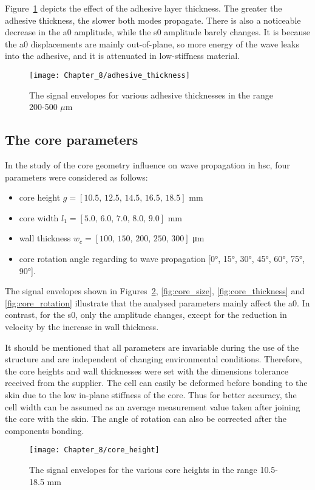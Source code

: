 \documentclass[11pt,a4paper,final]{report}
\theoremstyle{plain}
\begin{document}
Figure~\ref{fig:adhesive_thickness} depicts the effect of the adhesive layer thickness.
The greater the adhesive thickness, the slower both modes propagate.
There is also a noticeable decrease in the \ac{a0} amplitude, while the \ac{s0} amplitude barely changes.
It is because the \ac{a0} displacements are mainly out-of-plane, so more energy of the wave leaks into the adhesive, and it is attenuated in low-stiffness material.

\begin{figure}
	\begin{center}
		\texttt{[image: Chapter\_8/adhesive\_thickness]}
	\end{center}
	\caption{The signal envelopes for various adhesive thicknesses in the range 200-500 \(\mu\)m}
	\label{fig:adhesive_thickness}
\end{figure}
\clearpage
\subsection{The core parameters}
In the study of the core geometry influence on wave propagation in \ac{hsc}, four parameters were considered as follows:
\begin{itemize}
	\item core height \(g=[10.5,\,12.5,\,14.5,\,16.5,\,18.5]\) \unit{\mm}
	\item core width \(l_1=[5.0,\,6.0,\,7.0,\,8.0,\,9.0]\) \unit{\mm}
	\item wall thickness \(w_c=[100,\,150,\,200,\,250,\,300]\) \unit{\micro\m}
	\item core rotation angle regarding to wave propagation [\ang{0}, \ang{15}, \ang{30}, \ang{45}, \ang{60}, \ang{75}, \ang{90}].
\end{itemize}

The signal envelopes shown in Figures~\ref{fig:core_height}, \ref{fig:core_size}, \ref{fig:core_thickness} and \ref{fig:core_rotation} illustrate that the analysed parameters mainly affect the \ac{a0}.
In contrast, for the \ac{s0}, only the amplitude changes, except for the reduction in velocity by the increase in wall thickness.

It should be mentioned that all parameters are invariable during the use of the structure and are independent of changing environmental conditions.
Therefore, the core heights and wall thicknesses were set with the dimensions tolerance received from the supplier.
The cell can easily be deformed before bonding to the skin due to the low in-plane stiffness of the core.
Thus for better accuracy, the cell width can be assumed as an average measurement value taken after joining the core with the skin.
The angle of rotation can also be corrected after the components bonding.
\begin{figure}[!htb]
	\begin{center}
		\texttt{[image: Chapter\_8/core\_height]}
	\end{center}
	\caption{The signal envelopes for the various core heights in the range 10.5-18.5 \unit{\mm}}
	\label{fig:core_height}
\end{figure}
\end{document}
